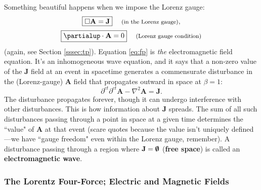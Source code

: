 \documentclass[12pt]{article}
\renewcommand{\vv}[1]{\mathbf{#1}}
\begin{document}
Something beautiful happens when we impose the Lorenz gauge:
\begin{equation}\label{eq:fp}
\boxed{ \Box \vv A = \vv J } \quad \textrm{\footnotesize{ (in the Lorenz gauge)}} ,
\end{equation}
\begin{equation}\label{eq:lg}
\boxed{ \partialup \cdot \vv A = 0 } \quad \textrm{\footnotesize{ (Lorenz gauge condition)}}
\end{equation}
(again, see Section \ref{sssec:tp}). Equation \ref{eq:fp} is \emph{the} electromagnetic field equation. It's an inhomogeneous wave equation, and it says that a non-zero value of the $\vv J$ field at an event in spacetime generates a commensurate disturbance in the (Lorenz-gauge) $\vv A$ field that propagates outward in space at $\beta = 1$:
\begin{equation*}
\partial^{ct} \partial^{ct} \vv A - \nabla ^2 \vv A = \vv J .
\end{equation*}
The disturbance propagates forever, though it can undergo interference with other disturbances. This is how information about $\vv J$ spreads. The sum of all such disturbances passing through a point in space at a given time determines the ``value" of $\vv A$ at that event (scare quotes because the value isn't uniquely defined---we have ``gauge freedom" even within the Lorenz gauge, remember). A disturbance passing through a region where $\vv J = \textrm{\mbox{\boldmath $\emptyset$}}$ (\textbf{free space}) is called an \textbf{electromagnetic wave}.


\subsubsection{The Lorentz Four-Force; Electric and Magnetic Fields}\label{sssec:lff}
\end{document}
